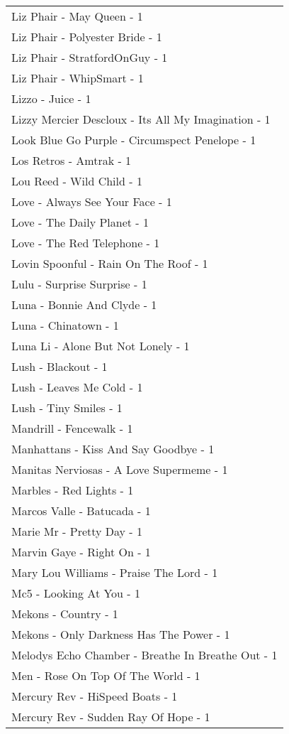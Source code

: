 \documentclass[
]{article}
\begin{document}
\begin{longtable}{l}
Liz Phair - May Queen - 1 \\ 
Liz Phair - Polyester Bride - 1 \\ 
Liz Phair - StratfordOnGuy - 1 \\ 
Liz Phair - WhipSmart - 1 \\ 
Lizzo - Juice - 1 \\ 
Lizzy Mercier Descloux - Its All My Imagination - 1 \\ 
Look Blue Go Purple - Circumspect Penelope - 1 \\ 
Los Retros - Amtrak - 1 \\ 
Lou Reed - Wild Child - 1 \\ 
Love - Always See Your Face - 1 \\ 
Love - The Daily Planet - 1 \\ 
Love - The Red Telephone - 1 \\ 
Lovin Spoonful - Rain On The Roof - 1 \\ 
Lulu - Surprise Surprise - 1 \\ 
Luna - Bonnie And Clyde - 1 \\ 
Luna - Chinatown - 1 \\ 
Luna Li - Alone But Not Lonely - 1 \\ 
Lush - Blackout - 1 \\ 
Lush - Leaves Me Cold - 1 \\ 
Lush - Tiny Smiles - 1 \\ 
Mandrill - Fencewalk - 1 \\ 
Manhattans - Kiss And Say Goodbye - 1 \\ 
Manitas Nerviosas - A Love Supermeme - 1 \\ 
Marbles - Red Lights - 1 \\ 
Marcos Valle - Batucada - 1 \\ 
Marie Mr - Pretty Day - 1 \\ 
Marvin Gaye - Right On - 1 \\ 
Mary Lou Williams - Praise The Lord - 1 \\ 
Mc5 - Looking At You - 1 \\ 
Mekons - Country - 1 \\ 
Mekons - Only Darkness Has The Power - 1 \\ 
Melodys Echo Chamber - Breathe In Breathe Out - 1 \\ 
Men - Rose On Top Of The World - 1 \\ 
Mercury Rev - HiSpeed Boats - 1 \\ 
Mercury Rev - Sudden Ray Of Hope - 1 \\ 

\end{longtable}
\end{document}
